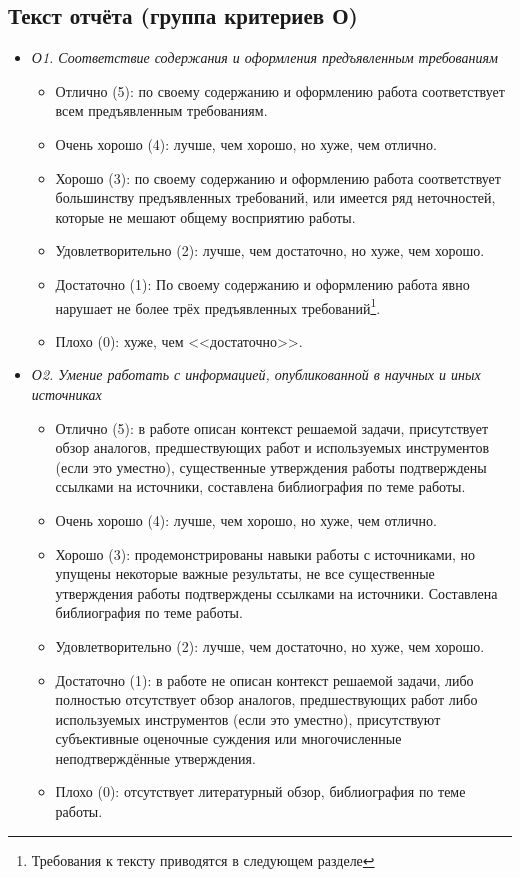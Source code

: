 \documentclass{article}
\begin{document}
\subsection{Текст отчёта (группа критериев О)}
\begin{itemize}
    \item \textit{О1. Соответствие содержания и оформления предъявленным требованиям}
    \begin{itemize}
        \item Отлично (5): 	по своему содержанию и оформлению работа соответствует всем предъявленным требованиям.
        \item Очень хорошо (4): лучше, чем хорошо, но хуже, чем отлично.
        \item Хорошо (3): по своему содержанию и оформлению работа соответствует большинству предъявленных требований, или имеется ряд неточностей, которые не мешают общему восприятию работы.
        \item Удовлетворительно (2): лучше, чем достаточно, но хуже, чем хорошо.
        \item Достаточно (1): По своему содержанию и оформлению работа явно нарушает не более трёх предъявленных требований\footnote{Требования к тексту приводятся в следующем разделе}. 
        \item Плохо (0): хуже, чем <<достаточно>>.
    \end{itemize}
    \item \textit{О2. Умение работать с информацией, опубликованной в научных и иных источниках}
    \begin{itemize}
        \item Отлично (5): в работе описан контекст решаемой задачи, присутствует обзор аналогов, предшествующих работ и используемых инструментов (если это уместно), существенные утверждения работы подтверждены ссылками на источники, составлена библиография по теме работы. 
        \item Очень хорошо (4): лучше, чем хорошо, но хуже, чем отлично.
        \item Хорошо (3): продемонстрированы навыки работы с источниками, но упущены некоторые важные результаты, не все существенные утверждения работы подтверждены ссылками на источники. Составлена библиография по теме работы.
        \item Удовлетворительно (2): лучше, чем достаточно, но хуже, чем хорошо.
        \item Достаточно (1): в работе не описан контекст решаемой задачи, либо полностью отсутствует обзор аналогов, предшествующих работ либо используемых инструментов (если это уместно), присутствуют субъективные оценочные суждения или многочисленные неподтверждённые утверждения.
        \item Плохо (0): отсутствует литературный обзор, библиография по теме работы.
    \end{itemize}
\end{itemize}
\end{document}
